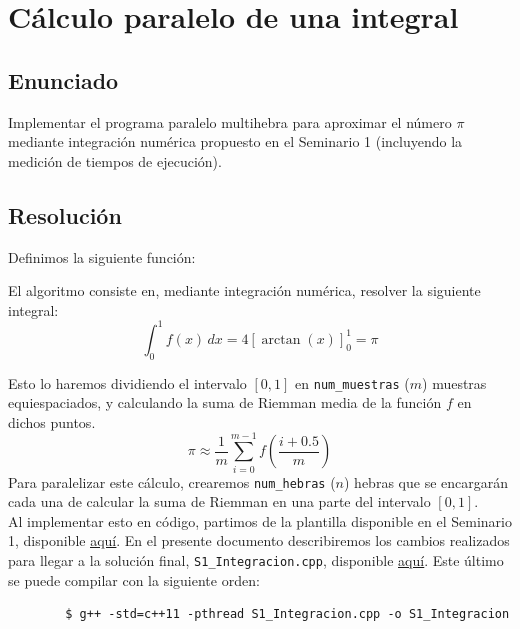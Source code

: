 \documentclass[12pt]{book}
\begin{document}

    


    \chapter{Cálculo paralelo de una integral}
    
    
    \section{Enunciado}
    Implementar el programa paralelo multihebra para aproximar el número $\pi$ mediante integración numérica propuesto en el Seminario 1 (incluyendo la medición de tiempos de ejecución).

    \section{Resolución}
    Definimos la siguiente función:

    El algoritmo consiste en, mediante integración numérica, resolver la siguiente integral:
    \[
        \int_{0}^{1} f(x) \, dx = 4\left[\arctan(x)\right]_{0}^{1} = \pi
    \]

    Esto lo haremos dividiendo el intervalo $[0,1]$ en \verb|num_muestras| ($m$) muestras equiespaciados, y calculando la suma de Riemman media de la función $f$ en dichos puntos.
    \begin{equation*}
        \pi \approx \frac{1}{m} \sum_{i=0}^{m-1} f\left(\frac{i+0.5}{m}\right) 
    \end{equation*}
    Para paralelizar este cálculo, crearemos \verb|num_hebras| ($n$) hebras que se encargarán cada una de calcular la suma de Riemman en una parte del intervalo $[0,1]$.\\

    Al implementar esto en código, partimos de la plantilla disponible en el Seminario 1, disponible \href{https://github.com/LosDelDGIIM/LosDelDGIIM.github.io/blob/main/subjects/SCD/Prácticas/Seminario1/Código/Integracion_Plantilla.cpp}{\color{blue}\ul{aquí}}.
    En el presente documento describiremos los cambios realizados para llegar a la solución final, \verb|S1_Integracion.cpp|, disponible \href{https://github.com/LosDelDGIIM/LosDelDGIIM.github.io/blob/main/subjects/SCD/Prácticas/Seminario1/Código/Integracion.cpp}{\color{blue}\ul{aquí}}.
    Este último se puede compilar con la siguiente orden:
    \begin{verbatim}
        $ g++ -std=c++11 -pthread S1_Integracion.cpp -o S1_Integracion
    \end{verbatim}
\end{document}
